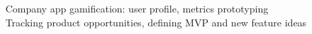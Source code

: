 \begin{cvtable}
{     \textperiodcentered $ $ Company app gamification: user profile, metrics prototyping \\
     \textperiodcentered $ $ Tracking product opportunities, defining MVP and new feature ideas \\
%
}


\end{cvtable}
